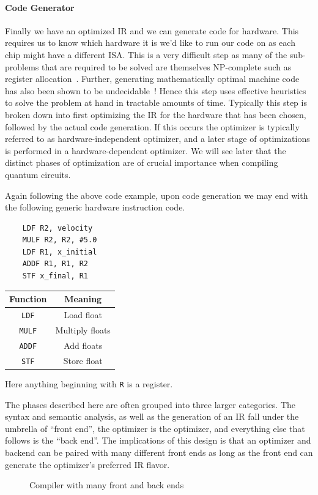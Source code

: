 \paragraph{Code Generator}
Finally we have an optimized \ac{IR} and we can generate code for hardware.
This requires us to know which hardware it is we'd like to run our code on as each chip might have a different \ac{ISA}.
This is a very difficult step as many of the sub-problems that are required to be solved are themselves NP-complete such as register allocation~\cite{register-allocation-NP}. %
Further, generating mathematically optimal machine code has also been shown to be undecidable~\cite{dragonbook}!
Hence this step uses effective heuristics to solve the problem at hand in tractable amounts of time.
Typically this step is broken down into first optimizing the \ac{IR} for the hardware that has been chosen, followed by the actual code generation.
If this occurs the optimizer is typically referred to as hardware-independent optimizer, and a later stage of optimizations is performed in a hardware-dependent optimizer.
We will see later that the distinct phases of optimization are of crucial importance when compiling quantum circuits.

Again following the above code example, upon code generation we may end with the following generic hardware instruction code.

\begin{minipage}{0.5\textwidth}
    \begin{lstlisting}
    LDF R2, velocity
    MULF R2, R2, #5.0
    LDF R1, x_initial
    ADDF R1, R1, R2
    STF x_final, R1
\end{lstlisting}
\end{minipage}
\begin{minipage}{0.5\textwidth}
    \centering
    \begin{tabular}{cc}
        Function      & Meaning         \\ \toprule
        \texttt{LDF}  & Load float      \\
        \texttt{MULF} & Multiply floats \\
        \texttt{ADDF} & Add floats      \\
        \texttt{STF}  & Store float
    \end{tabular}
    \label{fig:machcode}
\end{minipage}
Here anything beginning with \texttt{R} is a register.

The phases described here are often grouped into three larger categories.
The syntax and semantic analysis, as well as the generation of an \ac{IR} fall under the umbrella of ``front end'', the optimizer is the optimizer, and everything else that follows is the ``back end''.
The implications of this design is that an optimizer and backend can be paired with many different front ends as long as the front end can generate the optimizer's preferred \ac{IR} flavor.
\begin{figure}[ht]
    \centering
    
    \caption{Compiler with many front and back ends}\label{fig:compends}
\end{figure}

